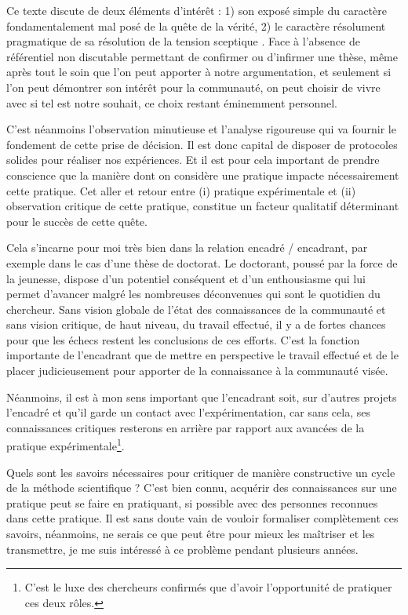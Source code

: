 Ce texte discute de deux éléments d'intérêt : 1) son exposé simple du caractère fondamentalement mal posé de la quête de la vérité, 2) le caractère résolument pragmatique de sa résolution de la \og tension sceptique \fg. Face à l'absence de référentiel non discutable permettant de confirmer ou d'infirmer une thèse, même après tout le soin que l'on peut apporter à notre argumentation, et seulement si l'on peut démontrer son intérêt pour la communauté, on peut choisir de vivre avec si tel est notre souhait, ce choix restant éminemment personnel.

C'est néanmoins l'observation minutieuse et l'analyse rigoureuse qui va fournir le fondement de cette prise de décision. Il est donc capital de disposer de protocoles solides pour réaliser nos expériences. Et il est pour cela important de prendre conscience que la manière dont on considère une pratique impacte nécessairement cette pratique. Cet aller et retour entre (i) pratique expérimentale et (ii) observation critique de cette pratique, constitue un facteur qualitatif déterminant pour le succès de cette quête.

Cela s'incarne pour moi très bien dans la relation encadré / encadrant, par exemple dans le cas d'une thèse de doctorat. Le doctorant, poussé par la force de la jeunesse, dispose d'un potentiel conséquent et d'un enthousiasme qui lui permet d'avancer malgré les nombreuses déconvenues qui sont le quotidien du chercheur. Sans vision globale de l'état des connaissances de la communauté et sans vision critique, de haut niveau, du travail effectué, il y a de fortes chances pour que les échecs restent les conclusions de ces efforts. C'est la fonction importante de l'encadrant que de mettre en perspective le travail effectué et de le placer judicieusement pour apporter de la connaissance à la communauté visée.

Néanmoins, il est à mon sens important que l'encadrant soit, sur d'autres projets l'encadré et qu'il garde un contact avec l'expérimentation, car sans cela, ses connaissances critiques resterons en arrière par rapport aux avancées de la pratique expérimentale\footnote{C'est le luxe des chercheurs confirmés que d'avoir l'opportunité de pratiquer ces deux rôles.}. %

Quels sont les savoirs nécessaires pour critiquer de manière constructive un cycle de la méthode scientifique ? C'est bien connu, acquérir des connaissances sur une pratique peut se faire en pratiquant, si possible avec des personnes reconnues dans cette pratique. Il est sans doute vain de vouloir formaliser complètement ces savoirs, néanmoins, ne serais ce que peut être pour mieux les maîtriser et les transmettre, je me suis intéressé à ce problème pendant plusieurs années.

